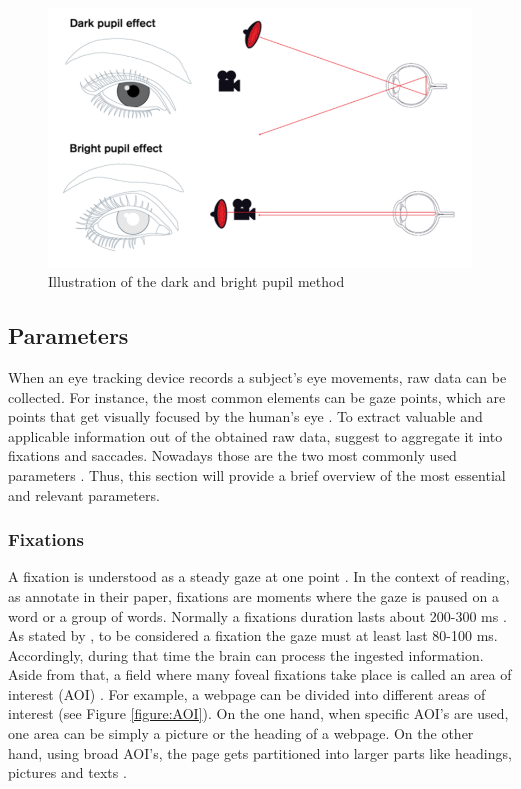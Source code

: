 \begin{figure}[!ht]
    \centering
    \includegraphics[width=1\linewidth]{images/DarkBright.png}
    \caption{
        Illustration of the dark and bright pupil method  \autocite[]{tobii2018dark}
    }
    \label{figure:DarkBright}
\end{figure}


\subsection{Parameters}
\label{subsection:Parameters}
When an eye tracking device records a subject's eye movements, raw data can be collected. For instance, the most common elements can be gaze points, which are points that get visually focused by the human's eye \autocite{bojko2009informative, vspakov2007visualization}. To extract valuable and applicable information out of the obtained raw data, \textcite[]{blascheck2014state}  suggest to aggregate it into fixations and saccades. 
Nowadays those are the two most commonly used parameters \autocite{bruneau2002eyes}. Thus, this section will provide a brief overview of the most essential and relevant parameters.

\subsubsection{Fixations}
A fixation is understood as a steady gaze at one point \autocite[]{buscher2009you}.  In the context of reading, as \textcite[]{beymer2007eye} annotate in their paper, fixations are moments where the gaze is paused on a word or a group of words. 
Normally a fixations duration lasts about 200-300 ms \autocite[]{kasneci2015online}. As stated by \textcite[]{buscher2009you}, to be considered a fixation the gaze must at least last 80-100 ms. Accordingly, during that time the brain can process the ingested information. Aside from that, a field where many foveal fixations take place is called an area of interest (AOI) \autocite[]{djamasbi2014eye}. For example, a webpage can be divided into different areas of interest (see Figure \ref{figure:AOI}).  On the one hand, when specific AOI's are used, one area can be simply a picture or the heading of a webpage. On the other hand, using broad AOI's, the page gets partitioned into larger parts like headings, pictures and texts \autocite{djamasbi2014eye}. 

